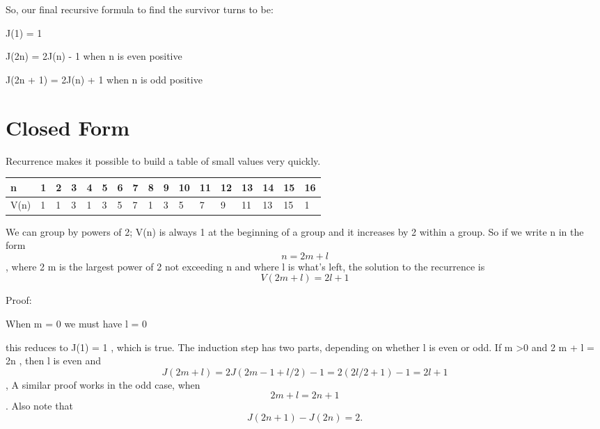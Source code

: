 \documentclass{article}
\begin{document}
So, our final recursive formula to find the survivor turns to be:


J(1) = 1

J(2n) = 2J(n) - 1 when n is even positive

J(2n + 1) = 2J(n) + 1 when  n is odd positive

\section{Closed Form}

Recurrence makes it possible to build a table of small values very
quickly. 

\begin{center}
\begin{tabular}{|l|l|l|l|l|l|l|l|l|l|l|l|l|l|l|l|l|}
\hline
n    & 1 & 2 & 3 & 4 & 5 & 6 & 7 & 8 & 9 & 10 & 11 & 12 & 13 & 14 & 15 & 16\\ \hline
V(n) & 1 & 1 & 3 & 1 & 3 & 5 & 7 & 1 & 3 & 5  & 7  & 9  & 11 & 13 & 15 & 1\\ \hline
\end{tabular}
\end{center}


We can group by powers of
2; V(n) is always 1 at the beginning of a group and it increases by 2
within a group. So if we write n in the form $$ n = 2 m + l$$ , where 2 m is the
largest power of 2 not exceeding n and where l is what's left, the solution to
the recurrence is
$$V(2 m + l) = 2l + 1$$ 

Proof:

When m = 0 we must have l = 0

this reduces to J(1) = 1 , which is true. The induction step has two parts,
depending on whether l is even or odd. If m \textgreater  0 and 2 m + l = 2n , then l is
even and
$$J(2 m + l) = 2J(2 m - 1 + l/2) - 1 = 2(2l/2 + 1) - 1 = 2l + 1$$ , A similar
proof works in the odd case, when $$2 m + l = 2n + 1$$ . Also note that
$$J(2n + 1) - J(2n) = 2.$$
\end{document}
